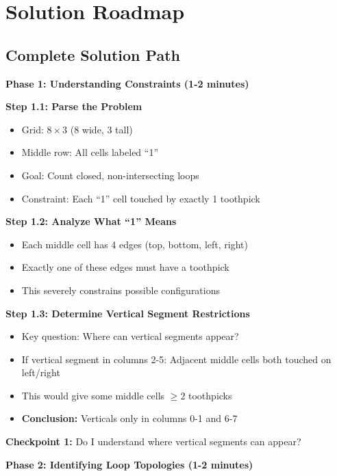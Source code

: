 \documentclass[12pt]{article}
\begin{document}
\section{Solution Roadmap}

\begin{solutionbox}

\subsection*{Complete Solution Path}

\textbf{Phase 1: Understanding Constraints (1-2 minutes)}

\textbf{Step 1.1: Parse the Problem}
\begin{itemize}
    \item Grid: $8 \times 3$ (8 wide, 3 tall)
    \item Middle row: All cells labeled ``1''
    \item Goal: Count closed, non-intersecting loops
    \item Constraint: Each ``1'' cell touched by exactly 1 toothpick
\end{itemize}

\textbf{Step 1.2: Analyze What ``1'' Means}
\begin{itemize}
    \item Each middle cell has 4 edges (top, bottom, left, right)
    \item Exactly one of these edges must have a toothpick
    \item This severely constrains possible configurations
\end{itemize}

\textbf{Step 1.3: Determine Vertical Segment Restrictions}
\begin{itemize}
    \item Key question: Where can vertical segments appear?
    \item If vertical segment in columns 2-5: Adjacent middle cells both touched on left/right
    \item This would give some middle cells $\geq 2$ toothpicks
    \item \textbf{Conclusion:} Verticals only in columns 0-1 and 6-7
\end{itemize}

\textbf{Checkpoint 1:} Do I understand where vertical segments can appear?

\textbf{Phase 2: Identifying Loop Topologies (1-2 minutes)}


\end{solutionbox}
\end{document}
